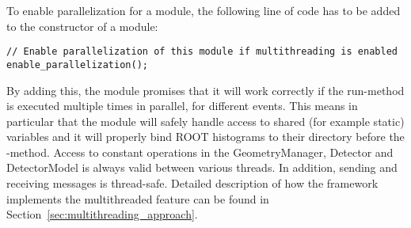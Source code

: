 To enable parallelization for a module, the following line of code has to be added to the constructor of a module:
\begin{verbatim}
// Enable parallelization of this module if multithreading is enabled
enable_parallelization();
\end{verbatim}
By adding this, the module promises that it will work correctly if the run-method is executed multiple times in parallel, for different events.
This means in particular that the module will safely handle access to shared (for example static) variables and it will properly bind ROOT histograms to their directory before the -method.
Access to constant operations in the GeometryManager, Detector and DetectorModel is always valid between various threads. In addition, sending and receiving messages is thread-safe.
Detailed description of how the framework implements the multithreaded feature can be found in Section~\ref{sec:multithreading_approach}.

